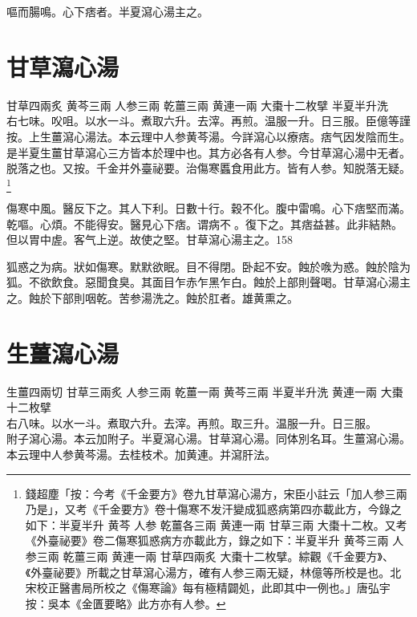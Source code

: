 嘔而腸鳴。心下痞者。半夏瀉心湯主之。

\section{甘草瀉心湯}

甘草{\scriptsize 四兩炙} 黄芩{\scriptsize 三兩} 人参{\scriptsize 三兩} 乾薑{\scriptsize 三兩} 黄連{\scriptsize 一兩} 大棗{\scriptsize 十二枚擘} 半夏{\scriptsize 半升洗}\\
右七味。㕮咀。以水一斗。煮取六升。去滓。再煎。温服一升。日三服。{\scriptsize 臣億等謹按。上生薑瀉心湯法。本云理中人参黄芩湯。今詳瀉心以療痞。痞气因发陰而生。是半夏生薑甘草瀉心三方皆本於理中也。其方必各有人参。今甘草瀉心湯中无者。脱落之也。又按。千金并外臺祕要。治傷寒䘌食用此方。皆有人参。知脱落无疑。}
	\footnote{
		錢超塵「按：今考《千金要方》卷九甘草瀉心湯方，宋臣小註云「加人参三兩乃是」，又考《千金要方》卷十傷寒不发汗變成狐惑病第四亦載此方，今錄之如下：半夏{\scriptsize 半升}{ }黄芩{ }人参{ }乾薑{\scriptsize 各三兩}{ }黄連{\scriptsize 一兩}{ }甘草{\scriptsize 三兩}{ }大棗{\scriptsize 十二枚}。又考《外臺祕要》卷二傷寒狐惑病方亦載此方，錄之如下：半夏{\scriptsize 半升}{ }黄芩{\scriptsize 三兩}{ }人参{\scriptsize 三兩}{ }乾薑{\scriptsize 三兩}{ }黄連{\scriptsize 一兩}{ }甘草{\scriptsize 四兩炙}{ }大棗{\scriptsize 十二枚擘}。綜觀《千金要方》、《外臺祕要》所載之甘草瀉心湯方，確有人参三兩无疑，林億等所校是也。北宋校正醫書局所校之《傷寒論》每有極精闢処，此即其中一例也。」唐弘宇按：吳本《金匱要略》此方亦有人参。
	}

傷寒中風。醫反下之。其人下利。日數十行。穀不化。腹中雷鳴。心下痞堅而滿。乾嘔。心煩。不{\khaai 能}得安。醫見心下痞。谓病不{\sungii 𥁞}。復下之。其痞益甚。此非結熱。但以胃中虗。客气上逆。故使之堅。甘草瀉心湯主之。158

狐惑之为病。狀如傷寒。默默欲眠。目不得閉。卧起不安。蝕於㗋为惑。蝕於陰为狐。不欲飲食。惡聞食臭。其面目乍赤乍黑乍白。蝕於上部則聲喝。甘草瀉心湯主之。蝕於下部則咽乾。苦参湯洗之。蝕於肛者。雄黄熏之。

\section{生薑瀉心湯}

生薑{\scriptsize 四兩切} 甘草{\scriptsize 三兩炙} 人参{\scriptsize 三兩} 乾薑{\scriptsize 一兩} 黄芩{\scriptsize 三兩} 半夏{\scriptsize 半升洗} 黄連{\scriptsize 一兩} 大棗{\scriptsize 十二枚擘}\\
右八味。以水一斗。煮取六升。去滓。再煎。取三升。温服一升。日三服。\\
附子瀉心湯。本云加附子。半夏瀉心湯。甘草瀉心湯。同体別名耳。生薑瀉心湯。本云理中人参黄芩湯。去桂枝术。加黄連。并瀉肝法。

